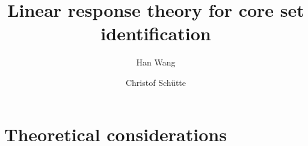 \documentclass[aip,jcp,a4paper,reprint,onecolumn]{revtex4-1}
\begin{document}
\title{Linear response theory for core set identification}
\author{Han Wang}
\author{Christof Sch\"utte}

\begin{abstract}
\end{abstract}

\maketitle

\section{Theoretical considerations}
\end{document}
